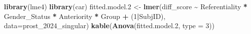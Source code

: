 \documentclass[
]{article}
\newenvironment{Shaded}{\begin{snugshade}}{\end{snugshade}}
\newcommand{\AttributeTok}[1]{\textcolor[rgb]{0.13,0.29,0.53}{#1}}
\newcommand{\DecValTok}[1]{\textcolor[rgb]{0.00,0.00,0.81}{#1}}
\newcommand{\FloatTok}[1]{\textcolor[rgb]{0.00,0.00,0.81}{#1}}
\newcommand{\FunctionTok}[1]{\textcolor[rgb]{0.13,0.29,0.53}{\textbf{#1}}}
\newcommand{\NormalTok}[1]{#1}
\newcommand{\OtherTok}[1]{\textcolor[rgb]{0.56,0.35,0.01}{#1}}
\newcommand{\SpecialCharTok}[1]{\textcolor[rgb]{0.81,0.36,0.00}{\textbf{#1}}}
\begin{document}
\begin{Shaded}
\begin{Highlighting}[]
\FunctionTok{library}\NormalTok{(lme4)}
\FunctionTok{library}\NormalTok{(car)}
\NormalTok{fitted.model}\FloatTok{.2} \OtherTok{\textless{}{-}} \FunctionTok{lmer}\NormalTok{(diff\_score }\SpecialCharTok{\textasciitilde{}}\NormalTok{ Referentiality }\SpecialCharTok{*}\NormalTok{ Gender\_Status }\SpecialCharTok{*}\NormalTok{ Anteriority }\SpecialCharTok{*}\NormalTok{ Group }\SpecialCharTok{+}\NormalTok{ (}\DecValTok{1}\SpecialCharTok{|}\NormalTok{SubjID), }\AttributeTok{data=}\NormalTok{prost\_2024\_singular)}
\FunctionTok{kable}\NormalTok{(}\FunctionTok{Anova}\NormalTok{(fitted.model}\FloatTok{.2}\NormalTok{, }\AttributeTok{type =} \DecValTok{3}\NormalTok{))}
\end{Highlighting}
\end{Shaded}
\end{document}
